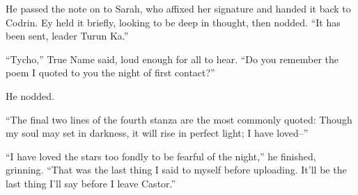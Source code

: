 He passed the note on to Sarah, who affixed her signature and handed it back to Codrin. Ey held it briefly, looking to be deep in thought, then nodded. ``It has been sent, leader Turun Ka.''

``Tycho,'' True Name said, loud enough for all to hear. ``Do you remember the poem I quoted to you the night of first contact?''

He nodded.

``The final two lines of the fourth stanza are the most commonly quoted: Though my soul may set in darkness, it will rise in perfect light; I have loved--''

``I have loved the stars too fondly to be fearful of the night,'' he finished, grinning. ``That was the last thing I said to myself before uploading. It'll be the last thing I'll say before I leave Castor.''
